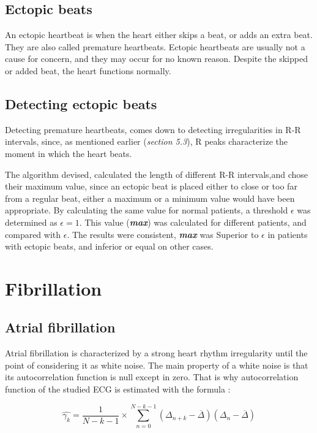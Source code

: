 \documentclass{article}
\begin{document}
\subsection{Ectopic beats}
An ectopic heartbeat is when the heart either skips a beat, or adds an extra beat. They are also called premature heartbeats. Ectopic heartbeats are usually not a cause for concern, and they may occur for no known reason. Despite the skipped or added beat, the heart  functions normally.

\subsection{Detecting ectopic beats}

Detecting premature heartbeats, comes down to detecting irregularities in R-R intervals, since, as mentioned earlier (\textit{section 5.3}), R peaks characterize the moment in which the heart beats.

The algorithm devised, calculated the length of different R-R intervals,and chose their maximum value, since an ectopic beat is placed either to close or too far from a regular beat, either a maximum or a minimum value would have been appropriate.
By calculating the same value for normal patients, a threshold $\epsilon$ was determined as $\epsilon = 1$.
This value (\textit{\textbf{max}}) was calculated for different patients, and compared with $\epsilon$.
The results were consistent, \textit{\textbf{max}} was Superior to $\epsilon$ in patients with ectopic beats, and inferior or equal on other cases.

\section{Fibrillation}

\subsection{Atrial fibrillation}


Atrial fibrillation is characterized by a strong heart rhythm irregularity until the point of considering it as white noise. The main property of a white noise is that its autocorrelation function is null except in zero. That is why autocorrelation function of the studied ECG is estimated with the formula :

\begin{equation}
    \hat{\gamma_k} = \frac{1}{N-k-1}\times\sum_{n=0}^{N-k-1} (\Delta_{n+k} - \overline{\Delta})(\Delta_{n} - \overline{\Delta})
\end{equation}
\end{document}

